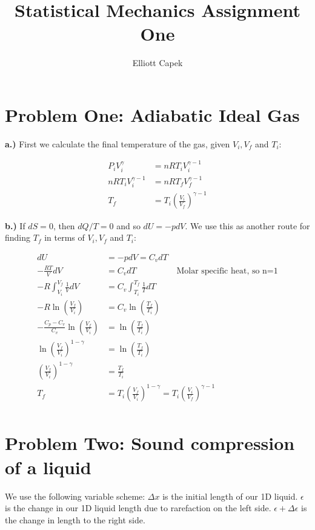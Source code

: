 \documentclass[10pt]{article} %
\title{Statistical Mechanics Assignment One}
\author{Elliott Capek}
\begin{document}
\maketitle{}

\section{Problem One: Adiabatic Ideal Gas}
\textbf{a.)}
First we calculate the final temperature of the gas, given $V_i, V_f$ and $T_i$:

\begin{align*}
  P_iV_i^\gamma &= nRT_iV_i^{\gamma-1}\\
  nRT_iV_i^{\gamma-1} &= nRT_fV_f^{\gamma-1}\\
  T_f &= T_i\left(\frac{V_i}{V_f}\right)^{\gamma-1}
\end{align*}

\textbf{b.)}
If $dS=0$, then $dQ/T=0$ and so $dU = -pdV$. We use this as another route for finding $T_f$ in
terms of $V_i, V_f$ and $T_i$:

\begin{align*}
  dU &= -pdV = C_vdT\\
  -\frac{RT}{V}dV &= C_vdT \hspace{2cm}\mbox{Molar specific heat, so n=1}\\
  -R\int_{V_i}^{V_f}\frac{1}{V}dV &= C_v\int_{T_i}^{T_f}\frac{1}{T}dT\\
  -R\ln\left(\frac{V_f}{V_i}\right) &= C_v\ln\left(\frac{T_f}{T_i}\right)\\
  -\frac{C_p-C_v}{C_v}\ln\left(\frac{V_f}{V_i}\right) &= \ln\left(\frac{T_f}{T_i}\right)\\
  \ln\left(\frac{V_f}{V_i}\right)^{1-\gamma} &= \ln\left(\frac{T_f}{T_i}\right)\\
  \left(\frac{V_f}{V_i}\right)^{1-\gamma} &= \frac{T_f}{T_i}\\
  T_f &= T_i\left(\frac{V_f}{V_i}\right)^{1-\gamma} = T_i\left(\frac{V_i}{V_f}\right)^{\gamma-1}\\
\end{align*}

\section{Problem Two: Sound compression of a liquid}
We use the following variable scheme: $\Delta x$ is the initial length of our 1D
liquid. $\epsilon$ is the change in our 1D liquid length due to rarefaction
on the left side. $\epsilon + \Delta \epsilon$ is the change in length to the right
side.
\end{document}
